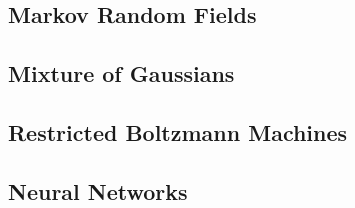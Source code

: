 \documentclass{article}
\begin{document}
\subsection{Markov Random Fields}

\subsection{Mixture of Gaussians}

\subsection{Restricted Boltzmann Machines}

\subsection{Neural Networks}
\end{document}
